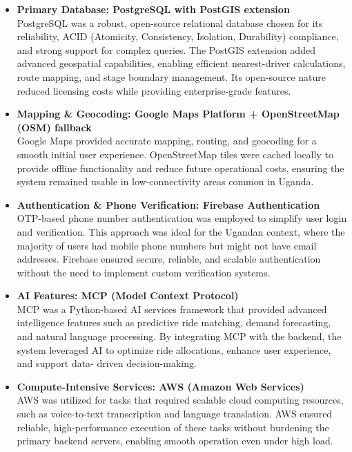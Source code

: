 \begin{itemize}
 \item \textbf{Primary Database: PostgreSQL with PostGIS extension} \\
PostgreSQL was a robust, open-source relational database chosen for its
reliability, ACID (Atomicity, Consistency, Isolation, Durability) compliance,
and strong support for complex queries. The PostGIS extension added advanced
geospatial capabilities, enabling efficient nearest-driver calculations, route
mapping, and stage boundary management. Its open-source nature reduced licensing
costs while providing enterprise-grade features.


 \item \textbf{Mapping \& Geocoding: Google Maps Platform + OpenStreetMap
        (OSM) fallback} \\
Google Maps provided accurate mapping, routing, and geocoding for a smooth
initial user experience. OpenStreetMap tiles were cached locally to provide
offline functionality and reduce future operational costs, ensuring the system
remained usable in low-connectivity areas common in Uganda.


 \item \textbf{Authentication \& Phone Verification: Firebase
        Authentication} \\
OTP-based phone number authentication was employed to simplify user login and
verification. This approach was ideal for the Ugandan context, where the
majority of users had mobile phone numbers but might not have email addresses.
Firebase ensured secure, reliable, and scalable authentication without the need
to implement custom verification systems.


 \item \textbf{AI Features: MCP (Model Context Protocol)} \\
MCP was a Python-based AI services framework that provided advanced intelligence
features such as predictive ride matching, demand forecasting, and natural
language processing. By integrating MCP with the backend, the system leveraged
AI to optimize ride allocations, enhance user experience, and support data-
driven decision-making.


 \item \textbf{Compute-Intensive Services: AWS (Amazon Web Services)} \\
AWS was utilized for tasks that required scalable cloud computing resources,
such as voice-to-text transcription and language translation. AWS ensured
reliable, high-performance execution of these tasks without burdening the
primary backend servers, enabling smooth operation even under high load.



\end{itemize}
